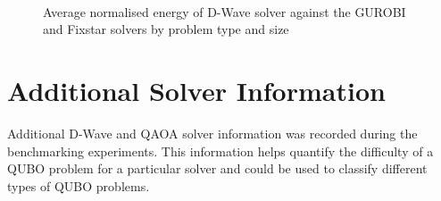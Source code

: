 \begin{figure}[!htb]
    \centering
    \hfill
    \\    
    \caption{Average normalised energy of D-Wave solver against the GUROBI and Fixstar solvers by problem type and size}
    \label{all-time-size}
\end{figure}

\section{Additional Solver Information}
Additional D-Wave and QAOA solver information was recorded during the benchmarking experiments. This information helps quantify the difficulty of a QUBO problem for a particular solver and could be used to classify different types of QUBO problems.
